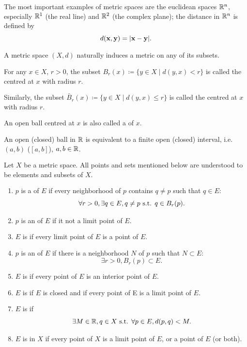 \begin{example}
The most important examples of metric spaces are the euclidean spaces $\mathbb R^n$, especially $\mathbb R^1$ (the real line) and $\mathbb R^2$ (the complex plane); the distance in $\mathbb R^n$ is defined by
\[ d(\vb{x},\vb{y})=|\vb{x}-\vb{y}|. \]
\end{example}

A metric space $(X,d)$ naturally induces a metric on any of its subsets.

\begin{definition}
For any $x\in X$, $r>0$, the subset $B_r(x)\coloneqq\{y\in X\mid d(y,x)<r\}$ is called the  centred at $x$ with radius $r$.

Similarly, the subset $\bar{B}_r(x)\coloneqq\{y\in X\mid d(y,x)\le r\}$ is called the  centred at $x$ with radius $r$.
\end{definition}

An open ball centred at $x$ is also called a  of $x$.

\begin{example}
An open (closed) ball in $\mathbb R$ is equivalent to a finite open (closed) interval, i.e. $(a,b)$ ($[a,b]$), $a,b\in\mathbb R$.
\end{example}

\begin{definition}
Let $X$ be a metric space. All points and sets mentioned below are understood to be elements and subsets of $X$.
\begin{enumerate}[label=(\arabic*)]
\item $p$ is a  of $E$ if every neighborhood of $p$ contains $q\neq p$ such that $q\in E$:
\[ \forall r>0,\exists q\in E, q\neq p\text{ s.t. } q\in B_r(p). \]
\item $p$ is an  of $E$ if it not a limit point of $E$.
\item $E$ is  if every limit point of $E$ is a point of $E$.
\item $p$ is an  of $E$ if there is a neighborhood $N$ of $p$ such that $N\subset E$:
\[ \exists r>0, B_r(p)\subset E. \]
\item $E$ is  if every point of $E$ is an interior point of $E$.
\item $E$ is  if $E$ is closed and if every point of E is a limit point of $E$.
\item $E$ is  if 
\[ \exists M\in\mathbb R, q\in X\text{ s.t. }\forall p\in E, d(p,q)<M. \]
\item $E$ is  in $X$ if every point of $X$ is a limit point of $E$, or a point of $E$ (or both). 
\end{enumerate}
\end{definition}

